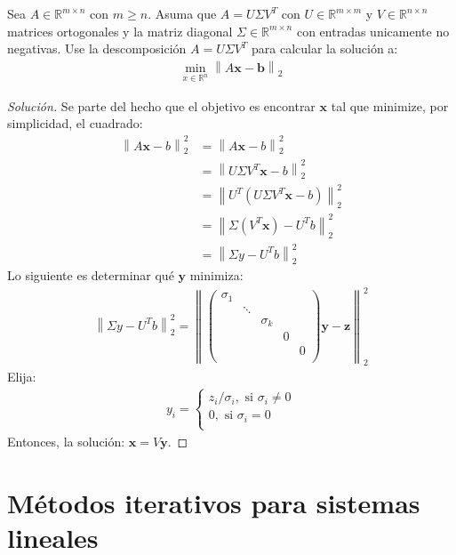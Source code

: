 \documentclass[12pt]{book}
\newcommand{\R}{\mathbb{R}}
\newcommand\norm[1]{\left\lVert#1\right\rVert}
\newenvironment{solucion}
  {\renewcommand\qedsymbol{$\square$}\begin{proof}[Solución]}
  {\end{proof}}
\begin{document}
\eje Sea $A\in\R^{m\times n}$ con $m\geq n$. Asuma que $A=U\Sigma V^T$ con $U\in\R^{m\times m}$ y $V\in\R^{n\times n}$ matrices ortogonales y la matriz diagonal $\Sigma \in \R^{m\times n}$ con entradas unicamente no negativas. Use la descomposición $A=U\Sigma V^T$ para calcular la solución a:
\begin{align*}
    \min_{x\in \R^n}{\norm{A\bm{x}-\bm{b}}_2}
\end{align*}
\begin{solucion}
    Se parte del hecho que el objetivo es encontrar $\bm{x}$ tal que minimize, por simplicidad, el cuadrado:
    \begin{align*}
        \norm{A\bm{x}-b}^2_2&=\norm{A\bm{x}-b}^2_2\\
        &=\norm{U\Sigma V^T\bm{x}-b}^2_2\\
        &=\norm{U^T(U\Sigma V^T\bm{x}-b)}^2_2\\
        &=\norm{\Sigma (V^T\bm{x})-U^Tb}^2_2\\
        &=\norm{\Sigma y-U^Tb}^2_2
    \end{align*}
    Lo siguiente es determinar qué $\bm{y}$ minimiza:
    \begin{align*}
        \norm{\Sigma y-U^Tb}^2_2=\norm{
            \begin{pmatrix}
                \sigma_1 & & & &\\
                 &      \ddots   & & &\\
                 & &\sigma_k & &\\
                 & & &0&\\
                 & & & &0\\
            \end{pmatrix}\bm{y}-\bm{z}
        }_2^2
    \end{align*}
    Elija:
    \begin{align*}
        y_i=\begin{cases}
            z_i/\sigma_i, \textrm{   si }\sigma_i\neq 0\\
            0, \textrm{   si }\sigma_i= 0\\
        \end{cases}
    \end{align*}
    Entonces, la solución: $\bm{x}=V\bm{y}$.
\end{solucion}
\chapter{Métodos iterativos para sistemas lineales}
\end{document}
